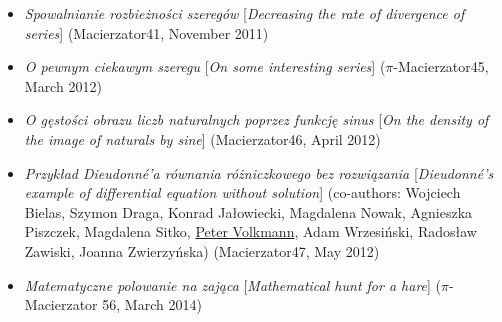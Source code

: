 \begin{itemize}
  \item \textsl{Spowalnianie rozbieżności szeregów} [\textsl{Decreasing the rate of divergence of series}] (Macierzator41, November 2011)
  \item \textsl{O pewnym ciekawym szeregu} [\textsl{On some interesting series}] ($\pi$-Macierzator45, March 2012)
  \item \textsl{O gęstości obrazu liczb naturalnych poprzez funkcję sinus} [\textsl{On the density of the image of naturals by sine}] (Macierzator46, April 2012)
  \item \textsl{Przykład Dieudonné'a równania różniczkowego bez rozwiązania} [\textsl{Dieudonné's example of differential equation without solution}] (co-authors: Wojciech Bielas, Szymon Draga, Konrad Jałowiecki, Magdalena Nowak, Agnieszka Piszczek, Magdalena Sitko, \href{\urlVolkmann}{Peter Volkmann}, Adam Wrzesiński, Radosław Zawiski, Joanna Zwierzyńska) (Macierzator47, May 2012)
  \item \textsl{Matematyczne polowanie na zająca} [\textsl{Mathematical hunt for a hare}] ($\pi$-Macierzator 56, March 2014)
\end{itemize}
